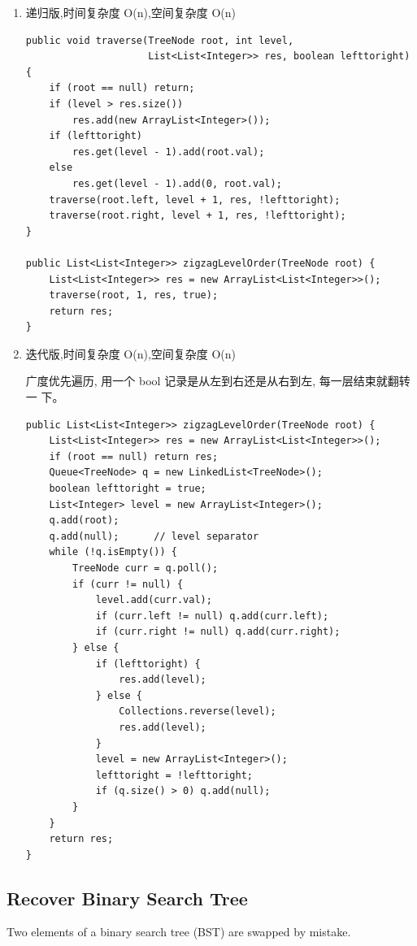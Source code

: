 \documentclass[12pt]{book}
\begin{document}
\begin{enumerate}
\item 递归版,时间复杂度 O(n),空间复杂度 O(n)
\label{sec-4-2-6-1}

\lstset{language=java,label= ,caption= ,numbers=none}
\begin{lstlisting}
public void traverse(TreeNode root, int level,
                     List<List<Integer>> res, boolean lefttoright) {
    if (root == null) return;
    if (level > res.size())
        res.add(new ArrayList<Integer>());
    if (lefttoright)
        res.get(level - 1).add(root.val);
    else
        res.get(level - 1).add(0, root.val);
    traverse(root.left, level + 1, res, !lefttoright);
    traverse(root.right, level + 1, res, !lefttoright);
}
        
public List<List<Integer>> zigzagLevelOrder(TreeNode root) {
    List<List<Integer>> res = new ArrayList<List<Integer>>();
    traverse(root, 1, res, true);
    return res;
}
\end{lstlisting}

\item 迭代版,时间复杂度 O(n),空间复杂度 O(n)
\label{sec-4-2-6-2}

广度优先遍历, 用一个 bool 记录是从左到右还是从右到左, 每一层结束就翻转一
下。

\lstset{language=java,label= ,caption= ,numbers=none}
\begin{lstlisting}
public List<List<Integer>> zigzagLevelOrder(TreeNode root) {
    List<List<Integer>> res = new ArrayList<List<Integer>>();
    if (root == null) return res;
    Queue<TreeNode> q = new LinkedList<TreeNode>();
    boolean lefttoright = true;
    List<Integer> level = new ArrayList<Integer>();
    q.add(root);
    q.add(null);      // level separator
    while (!q.isEmpty()) {
        TreeNode curr = q.poll();
        if (curr != null) {
            level.add(curr.val);
            if (curr.left != null) q.add(curr.left);
            if (curr.right != null) q.add(curr.right);
        } else {
            if (lefttoright) {
                res.add(level);
            } else {
                Collections.reverse(level);
                res.add(level);
            }
            level = new ArrayList<Integer>();
            lefttoright = !lefttoright;
            if (q.size() > 0) q.add(null);
        }
    }
    return res;
}
\end{lstlisting}
\end{enumerate}

\subsection{Recover Binary Search Tree}
\label{sec-4-2-7}
Two elements of a binary search tree (BST) are swapped by mistake.
\end{document}
